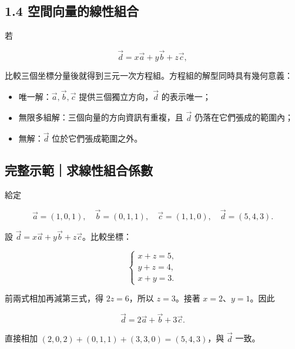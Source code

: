 \documentclass[11pt,a4paper]{article}
\providecommand{\tightlist}{%
  \setlength{\itemsep}{0pt}\setlength{\parskip}{0pt}}
\begin{document}
\subsection{1.4 空間向量的線性組合}\label{ux7a7aux9593ux5411ux91cfux7684ux7ddaux6027ux7d44ux5408}

若

\[
\vec d=x\vec a+y\vec b+z\vec c,
\]

比較三個坐標分量後就得到三元一次方程組。方程組的解型同時具有幾何意義：

\begin{itemize}
\tightlist
\item
  唯一解：\(\vec a,\vec b,\vec c\) 提供三個獨立方向，\(\vec d\) 的表示唯一；
\item
  無限多組解：三個向量的方向資訊有重複，且 \(\vec d\) 仍落在它們張成的範圍內；
\item
  無解：\(\vec d\) 位於它們張成範圍之外。
\end{itemize}

\begin{HandoutWorkedExample}

\subsection{完整示範｜求線性組合係數}\label{ux5b8cux6574ux793aux7bc4ux6c42ux7ddaux6027ux7d44ux5408ux4fc2ux6578}

給定

\[
\vec a=(1,0,1),\quad
\vec b=(0,1,1),\quad
\vec c=(1,1,0),\quad
\vec d=(5,4,3).
\]

設 \(\vec d=x\vec a+y\vec b+z\vec c\)。比較坐標：

\[
\begin{cases}
x+z=5,\\
y+z=4,\\
x+y=3.
\end{cases}
\]

前兩式相加再減第三式，得 \(2z=6\)，所以 \(z=3\)。接著 \(x=2\)、\(y=1\)。因此

\[
\boxed{\vec d=2\vec a+\vec b+3\vec c}.
\]

直接相加 \((2,0,2)+(0,1,1)+(3,3,0)=(5,4,3)\)，與 \(\vec d\) 一致。

\end{HandoutWorkedExample}
\end{document}
